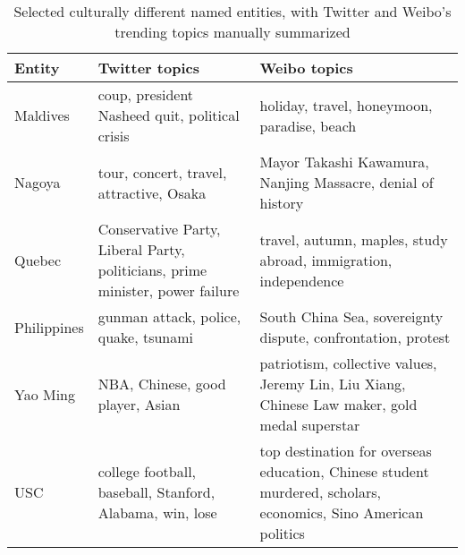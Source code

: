  
\begin{table*}[th!]
	\scriptsize
	\centering
	
	\caption{{\small Selected culturally different named entities, with Twitter and Weibo's trending topics manually summarized}\vspace{-15pt}}
	\begin{tabular}{L{1.5cm} L{5cm} L{8cm}}
		\textbf{Entity} & \textbf{Twitter topics} & \textbf{Weibo topics}
		\\ \hline
		Maldives & coup, president Nasheed quit, political crisis & holiday, travel, honeymoon, paradise, beach \\ \hline
		Nagoya & tour, concert, travel, attractive, Osaka & Mayor Takashi Kawamura, Nanjing Massacre, denial of history\\  \hline
				Quebec & Conservative Party, Liberal Party, politicians, prime minister, power failure & travel, autumn, maples, study abroad, immigration, independence   \\ \hline
				Philippines & gunman attack, police, quake, tsunami & South China Sea, sovereignty dispute, confrontation, protest  \\ \hline
		Yao Ming & NBA, Chinese, good player, Asian  & patriotism, collective values, Jeremy Lin, Liu Xiang, Chinese Law maker, gold medal superstar   \\ \hline USC & college football, baseball, Stanford, Alabama, win, lose & top destination for overseas education, 
Chinese student murdered, scholars, economics, Sino American politics \\ \hline
	\end{tabular}
\vspace{-10pt}
	\label{tab:mcdne_res_4}
\end{table*}
